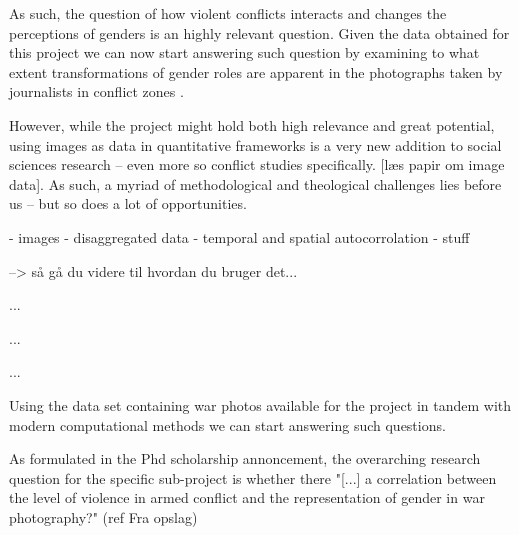 \documentclass[a4paper]{article}
\begin{document}
As such, the question of how violent conflicts interacts and changes the perceptions of genders is an highly relevant question. Given the data obtained for this project we can now start answering such question by examining to what extent transformations of gender roles are apparent in the photographs taken by journalists in conflict zones .\par


However, while the project might hold both high relevance and great potential, using images as data in quantitative frameworks is a very new addition to social sciences research -- even more so conflict studies specifically. [læs papir om image data]. As such, a myriad of methodological and theological challenges lies before us -- but so does a lot of opportunities.\par


- images
- disaggregated data - temporal and spatial autocorrolation 
- stuff

--> så gå du videre til hvordan du bruger det...

...

...

...

Using the data set containing war photos available for the project in tandem with modern computational methods we can start answering such questions.

As formulated in the Phd scholarship annoncement, the overarching research question for the specific sub-project is whether there
"[...] a correlation between the level of violence in armed conflict and the representation of gender in war photography?" (ref Fra opslag)

\end{document}
